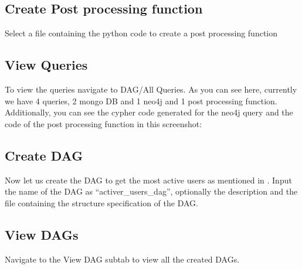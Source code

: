\documentclass[letterpaper,10pt,english]{sphinxmanual}
\begin{document}
\subsection{Create Post processing function}
\label{\detokenize{dashboard_website:create-post-processing-function}}
Select a file containing the python code to create a post processing function
\begin{quote}

\noindent{}
\end{quote}


\subsection{View Queries}
\label{\detokenize{dashboard_website:view-queries}}
To view the queries navigate to DAG/All Queries. As you can see here, currently we have 4 queries, 2 mongo DB and 1 neo4j and 1 post processing function. Additionally, you can see the cypher code generated for the neo4j query and the code of the post processing function in this screenshot:
\begin{quote}

\noindent{}
\end{quote}


\subsection{Create DAG}
\label{\detokenize{dashboard_website:create-dag}}
Now let us create the DAG to get the most active users as mentioned in {\hyperref[\detokenize{dag:building-a-dag-from-queries}]{}}.
Input the name of the DAG as “activer\_users\_dag”, optionally the description and the file containing the structure specification of the DAG.
\begin{quote}

\noindent{}
\end{quote}


\subsection{View DAGs}
\label{\detokenize{dashboard_website:view-dags}}
Navigate to the View DAG subtab to view all the created DAGs.

\noindent{}
\end{document}
